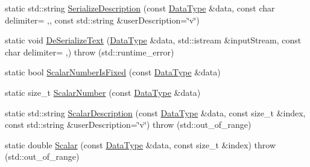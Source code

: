 \begin{DoxyCompactItemize}
\item 
static std\+::string \hyperlink{classcmn_data_3_01vct_fixed_size_vector_3_01__element_type_00_01__size_01_4_01_4_a9e72004f82707865c912ff74d5be411d}{Serialize\+Description} (const \hyperlink{classcmn_data_3_01vct_fixed_size_vector_3_01__element_type_00_01__size_01_4_01_4_ac8ff1c45828cc2add8111e02980f183a}{Data\+Type} \&data, const char delimiter= \textquotesingle{},\textquotesingle{}, const std\+::string \&user\+Description=\char`\"{}v\char`\"{})
\item 
static void \hyperlink{classcmn_data_3_01vct_fixed_size_vector_3_01__element_type_00_01__size_01_4_01_4_ac4807c248bde06dc6dbe1793173025ce}{De\+Serialize\+Text} (\hyperlink{classcmn_data_3_01vct_fixed_size_vector_3_01__element_type_00_01__size_01_4_01_4_ac8ff1c45828cc2add8111e02980f183a}{Data\+Type} \&data, std\+::istream \&input\+Stream, const char delimiter= \textquotesingle{},\textquotesingle{})  throw (std\+::runtime\+\_\+error)
\item 
static bool \hyperlink{classcmn_data_3_01vct_fixed_size_vector_3_01__element_type_00_01__size_01_4_01_4_a69f5801a80d617a9c97756429f4f008f}{Scalar\+Number\+Is\+Fixed} (const \hyperlink{classcmn_data_3_01vct_fixed_size_vector_3_01__element_type_00_01__size_01_4_01_4_ac8ff1c45828cc2add8111e02980f183a}{Data\+Type} \&data)
\item 
static size\+\_\+t \hyperlink{classcmn_data_3_01vct_fixed_size_vector_3_01__element_type_00_01__size_01_4_01_4_a4c99540fb651cdc206d3da2126acb85d}{Scalar\+Number} (const \hyperlink{classcmn_data_3_01vct_fixed_size_vector_3_01__element_type_00_01__size_01_4_01_4_ac8ff1c45828cc2add8111e02980f183a}{Data\+Type} \&data)
\item 
static std\+::string \hyperlink{classcmn_data_3_01vct_fixed_size_vector_3_01__element_type_00_01__size_01_4_01_4_a91520a61c8ffa02442586316577b988e}{Scalar\+Description} (const \hyperlink{classcmn_data_3_01vct_fixed_size_vector_3_01__element_type_00_01__size_01_4_01_4_ac8ff1c45828cc2add8111e02980f183a}{Data\+Type} \&data, const size\+\_\+t \&index, const std\+::string \&user\+Description=\char`\"{}v\char`\"{})  throw (std\+::out\+\_\+of\+\_\+range)
\item 
static double \hyperlink{classcmn_data_3_01vct_fixed_size_vector_3_01__element_type_00_01__size_01_4_01_4_a6c826af2ae1de2df965896d7b173d04a}{Scalar} (const \hyperlink{classcmn_data_3_01vct_fixed_size_vector_3_01__element_type_00_01__size_01_4_01_4_ac8ff1c45828cc2add8111e02980f183a}{Data\+Type} \&data, const size\+\_\+t \&index)  throw (std\+::out\+\_\+of\+\_\+range)
\end{DoxyCompactItemize}


